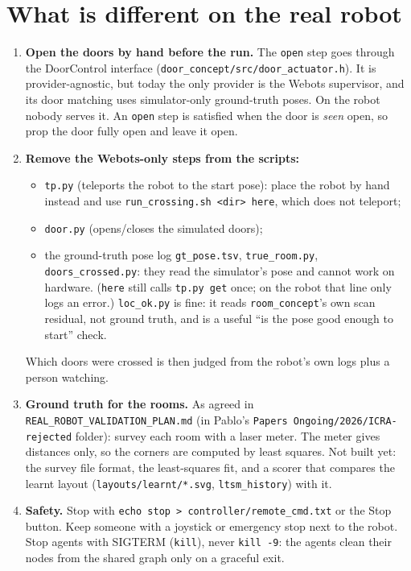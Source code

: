 \documentclass[11pt,a4paper]{article}
\newcommand{\f}[1]{\texttt{#1}}
\begin{document}
\section{What is different on the real robot}
\begin{enumerate}
\item \textbf{Open the doors by hand before the run.} The \f{open} step goes through the DoorControl interface
  (\f{door\_\allowbreak{}concept/\allowbreak{}src/\allowbreak{}door\_\allowbreak{}actuator.h}). It is provider-agnostic, but today the only provider is the Webots
  supervisor, and its door matching uses simulator-only ground-truth poses. On the robot nobody serves it. An
  \f{open} step is satisfied when the door is \emph{seen} open, so prop the door fully open and leave it open.
\item \textbf{Remove the Webots-only steps from the scripts:}
  \begin{itemize}
  \item \f{tp.py} (teleports the robot to the start pose): place the robot by hand instead and use
    \f{run\_\allowbreak{}crossing.sh <dir> here}, which does not teleport;
  \item \f{door.py} (opens/closes the simulated doors);
  \item the ground-truth pose log \f{gt\_\allowbreak{}pose.tsv}, \f{true\_\allowbreak{}room.py}, \f{doors\_\allowbreak{}crossed.py}: they read the simulator's pose and cannot work on hardware. (\f{here} still calls
    \f{tp.py get} once; on the robot that line only logs an error.) \f{loc\_\allowbreak{}ok.py} is fine: it reads
    \f{room\_\allowbreak{}concept}'s own scan residual, not ground truth, and is a useful ``is the pose good enough to start'' check.
  \end{itemize}
  Which doors were crossed is then judged from the robot's own logs plus a person watching.
\item \textbf{Ground truth for the rooms.} As agreed in \f{REAL\_\allowbreak{}ROBOT\_\allowbreak{}VALIDATION\_\allowbreak{}PLAN.md}
  (in Pablo's \f{Papers Ongoing/\allowbreak{}2026/\allowbreak{}ICRA-rejected} folder): survey each room with a laser meter. The meter gives
  distances only, so the corners are computed by least squares. Not built yet: the survey file format, the
  least-squares fit, and a scorer that compares the learnt layout (\f{layouts/\allowbreak{}learnt/\allowbreak{}*.svg}, \f{ltsm\_\allowbreak{}history}) with it.
\item \textbf{Safety.} Stop with \f{echo stop > controller/\allowbreak{}remote\_\allowbreak{}cmd.txt} or the Stop button. Keep someone with a
  joystick or emergency stop next to the robot. Stop agents with SIGTERM (\f{kill}), never \f{kill -9}: the agents
  clean their nodes from the shared graph only on a graceful exit.
\end{enumerate}
\end{document}

